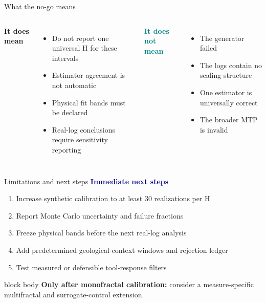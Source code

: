 \documentclass[aspectratio=169,11pt]{beamer}
\begin{document}
\begin{frame}{What the no-go means}
\begin{columns}[T,onlytextwidth]
\textcolor{Amber}{\Large\bfseries It does mean}
\begin{itemize}
  \item Do not report one universal H for these intervals
  \item Estimator agreement is not automatic
  \item Physical fit bands must be declared
  \item Real-log conclusions require sensitivity reporting
\end{itemize}
\textcolor{Teal}{\Large\bfseries It does not mean}
\begin{itemize}
  \item The generator failed
  \item The logs contain no scaling structure
  \item One estimator is universally correct
  \item The broader MTP is invalid
\end{itemize}
\end{columns}
\end{frame}

\begin{frame}{Limitations and next steps}
\textcolor{Navy}{\Large\bfseries Immediate next steps}
\begin{enumerate}
  \item Increase synthetic calibration to at least 30 realizations per H
  \item Report Monte Carlo uncertainty and failure fractions
  \item Freeze physical bands before the next real-log analysis
  \item Add predetermined geological-context windows and rejection ledger
  \item Test measured or defensible tool-response filters
\end{enumerate}
\vspace{0.2cm}
\begin{beamercolorbox}[sep=0.25cm,wd=\textwidth]{block body}
\textbf{Only after monofractal calibration:} consider a measure-specific multifractal and surrogate-control extension.
\end{beamercolorbox}
\end{frame}
\end{document}
